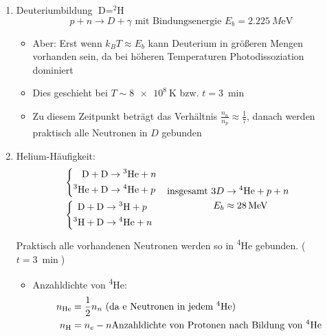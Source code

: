 \begin{enumerate}[label={$(\arabic*)$}]
	\item Deuteriumbildung $\text{D}=^2\text{H}$
		\begin{equation*}
			p+n\to D+\gamma \text{ mit Bindungsenergie $E_b=\SI{2.225}{M\eV}$}
		\end{equation*}
		\begin{itemize}
			\item Aber: Erst wenn $k_BT\approx E_b$ kann Deuterium in größeren Mengen vorhanden sein, da bei höheren Temperaturen Photodissoziation dominiert
			\item Dies geschieht bei $T\sim \SI{8e8}{\K}$ bzw. $t=\SI{3}{\min}$
			\item Zu diesem Zeitpunkt beträgt das Verhältnis $\frac{n_n}{n_p}\approx\frac{1}{7}$, danach werden praktisch alle Neutronen in $D$ gebunden
		\end{itemize}
	\item Helium-Häufigkeit:
		\begin{align*}
			&\begin{aligned}&\left\{\begin{aligned}\text{D}+\text{D}&\to\text{\textsuperscript{3}He}+n\\
			\text{\textsuperscript{3}He}+\text{D}&\to\text{\textsuperscript{4}He}+p\end{aligned}\right.\\
			&\left\{\begin{aligned}\text{D}+\text{D}&\to\text{\textsuperscript{3}H}+p\\
			\text{\textsuperscript{3}H}+\text{D}&\to\text{\textsuperscript{4}He}+n\end{aligned}\right.\end{aligned} & &\begin{aligned}\text{insgesamt } 3D&\to\text{\textsuperscript{4}He}+p+n \\ E_b&\approx\SI{28}{M\eV}\end{aligned}
		\end{align*}
		Praktisch alle vorhandenen Neutronen werden so in \textsuperscript{4}He gebunden. ($t=\SI{3}{\min}$)
		\begin{itemize}
			\item Anzahldichte von \textsuperscript{4}He:
				\begin{align*}
					n_\text{He}&=\frac{1}{2}n_n \text{ (da e Neutronen in jedem \textsuperscript{4}He)}\\
					n_\text{H}&=n_e-n \text{Anzahldichte von Protonen nach Bildung von \textsuperscript{4}He}

\end{align*}
\end{itemize}
\end{enumerate}

